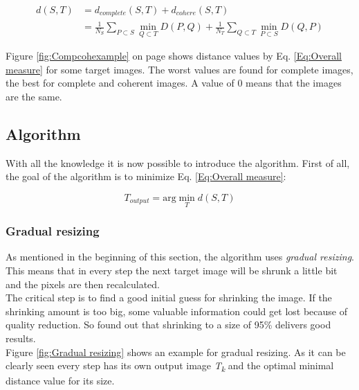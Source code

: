 \large
\begin{align}
\label{Eq:Overall measure}
d(S,T)&=d_{complete}(S,T)+d_{cohere}(S,T) \nonumber \\
&=\frac{1}{N_{S}}\sum_{P \subset S} \min\limits_{Q \subset T} D(P,Q)+\frac{1}{N_{T}}\sum_{Q \subset T} \min\limits_{P \subset S} D(Q,P)
\end{align}
\normalsize

Figure \ref{fig:Compcohexample} on page \pageref{fig:Compcohexample} shows distance values by Eq. \ref{Eq:Overall measure} for some target images. The worst values are found for complete images, the best for complete and coherent images. A value of 0 means that the images are the same.

\subsection{Algorithm}
With all the knowledge it is now possible to introduce the algorithm. First of all, the goal of the algorithm is to minimize Eq. \ref{Eq:Overall measure}:

\large
\begin{equation}
\label{Eq:Minimize distance}
T_{output}=\text{arg} \min\limits_{T}d(S,T)
\end{equation}
\normalsize

\subsubsection{Gradual resizing}
As mentioned in the beginning of this section, the algorithm uses \textit{gradual resizing}. This means that in every step the next target image will be shrunk a little bit and the pixels are then recalculated.\\
The critical step is to find a good initial guess for shrinking the image. If the shrinking amount is too big, some valuable information could get lost because of quality reduction. So \cite{bisi} found out that shrinking to a size of 95\% delivers good results.\\
Figure \ref{fig:Gradual resizing} shows an example for gradual resizing. As it can be clearly seen every step has its own output image \textit{T\textsubscript{k}} and the optimal minimal distance value for its size.

